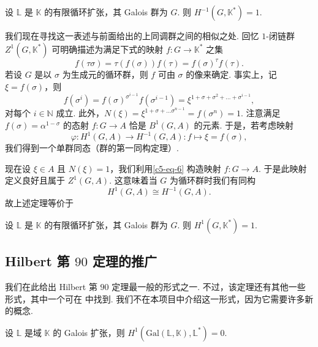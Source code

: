 \begin{theorem}\label{c5-thm-4-4}
设 $\mathbb{L}$ 是 $\mathbb{K}$ 的有限循环扩张，其 Galois 群为 $G$. 则 $H^{-1}(G,\mathbb{K}^*)=1$.
\end{theorem}

我们现在寻找这一表述与前面给出的上同调群之间的相似之处. 回忆 $1$-闭链群 $Z^1(G,\mathbb{K}^*)$ 可明确描述为满足下式的映射 $f:G\to\mathbb{K}^*$ 之集
\[
f(\tau\sigma)=\tau(f(\sigma))f(\tau)=f(\sigma)^\tau f(\tau).
\]
若设 $G$ 是以 $\sigma$ 为生成元的循环群，则 $f$ 可由 $\sigma$ 的像来确定. 事实上，记 $\xi=f(\sigma)$，则
\begin{equation}\label{c5-eq-6}
f(\sigma^i)=f(\sigma)^{\sigma^{i-1}}f(\sigma^{i-1})=\xi^{1+\sigma+\sigma^2+\ldots+\sigma^{i-1}},
\end{equation}
对每个 $i\in\mathbb{N}$ 成立. 此外，$N(\xi)=\xi^{1+\sigma+\ldots\sigma^{n-1}}=f(\sigma^n)=1$. 注意满足 $f(\sigma)=\alpha^{1-\sigma}$ 的态射 $f:G\to A$ 恰是 $B^1(G,A)$ 的元素. 于是，若考虑映射
\[
\varphi:H^1(G,A)\to H^{-1}(G,A):f\mapsto\xi=f(\sigma),
\]
我们得到一个单群同态（群的第一同构定理）.

现在设 $\xi\in A$ 且 $N(\xi)=1$，我们利用\eqref{c5-eq-6} 构造映射 $f:G\to A$. 于是此映射定义良好且属于 $Z^1(G,A)$. 这意味着当 $G$ 为循环群时我们有同构
\[
H^1(G,A)\cong H^{-1}(G,A).
\]
故上述定理等价于

\begin{theorem}\label{c5-thm-4-5}
设 $\mathbb{L}$ 是 $\mathbb{K}$ 的有限循环扩张，其 Galois 群为 $G$. 则 $H^1(G,\mathbb{K}^*)=1$.
\end{theorem}

\subsection{Hilbert 第 \texorpdfstring{$90$}{90} 定理的推广}
\label{c5-sub-4-3}

我们在此给出 Hilbert 第 $90$ 定理最一般的形式之一. 不过，该定理还有其他一些形式，其中一个可在 \cite{sch02} 中找到. 我们不在本项目中介绍这一形式，因为它需要许多新的概念.

\begin{theorem}\label{c5-thm-4-6}
设 $\mathbb{L}$ 是域 $\mathbb{K}$ 的 Galois 扩张，则 $H^1(\mathrm{Gal}(\mathbb{L},\mathbb{K}),\mathbb{L}^*)=0$.
\end{theorem}

